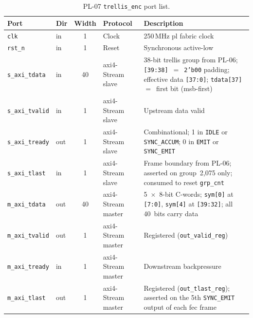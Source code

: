 \FloatBarrier

\begin{table}[htbp]
  \caption{PL-07 \texttt{trellis\_enc} port list.}
  \label{tab:pl07_ports}
  \centering
  \small
  \begin{tabular}{llcp{2.7cm}p{7.8cm}}
    \hline
    Port                    & Dir  & Width & Protocol               & Description \\
    \hline
    \texttt{clk}            & in   & 1     & Clock
      & 250\,MHz \ac{pl} fabric clock \\[2pt]
    \texttt{rst\_n}         & in   & 1     & Reset
      & Synchronous active-low \\[2pt]
    \texttt{s\_axi\_tdata}  & in   & 40    & \ac{axi}4-Stream slave
      & 38-bit trellis group from PL-06; \texttt{[39:38]}~$=$~\texttt{2'b00}
        padding; effective data \texttt{[37:0]}; \texttt{tdata[37]}~$=$~first
        bit (\ac{msb}-first) \\[2pt]
    \texttt{s\_axi\_tvalid} & in   & 1     & \ac{axi}4-Stream slave
      & Upstream data valid \\[2pt]
    \texttt{s\_axi\_tready} & out  & 1     & \ac{axi}4-Stream slave
      & Combinational; 1 in \texttt{IDLE} or \texttt{SYNC\_ACCUM};
        0 in \texttt{EMIT} or \texttt{SYNC\_EMIT} \\[2pt]
    \texttt{s\_axi\_tlast}  & in   & 1     & \ac{axi}4-Stream slave
      & Frame boundary from PL-06; asserted on group~2{,}075 only;
        consumed to reset \texttt{grp\_cnt} \\[2pt]
    \texttt{m\_axi\_tdata}  & out  & 40    & \ac{axi}4-Stream master
      & 5~$\times$~8-bit C-words; \texttt{sym[0]} at \texttt{[7:0]},
        \texttt{sym[4]} at \texttt{[39:32]}; all 40~bits carry data \\[2pt]
    \texttt{m\_axi\_tvalid} & out  & 1     & \ac{axi}4-Stream master
      & Registered (\texttt{out\_valid\_reg}) \\[2pt]
    \texttt{m\_axi\_tready} & in   & 1     & \ac{axi}4-Stream master
      & Downstream backpressure \\[2pt]
    \texttt{m\_axi\_tlast}  & out  & 1     & \ac{axi}4-Stream master
      & Registered (\texttt{out\_tlast\_reg}); asserted on the 5th
        \texttt{SYNC\_EMIT} output of each \ac{fec} frame \\
    \hline
  \end{tabular}
\end{table}


